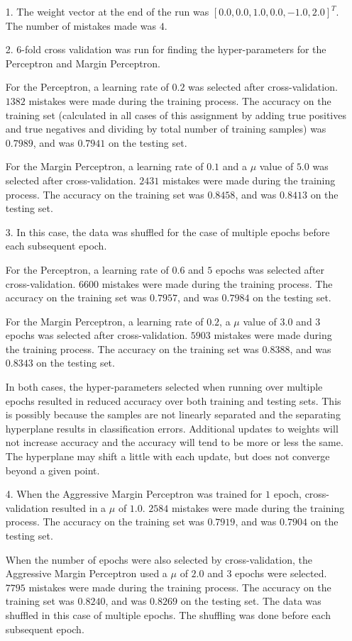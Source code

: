 \begin{enumerate}
\item[1.] The weight vector at the end of the run was $\left [0.0, 0.0, 1.0, 0.0, -1.0, 2.0 \right ] ^ T$. The number of mistakes made was $4$.
  
\item[2.] 6-fold cross validation was run for finding the hyper-parameters for the Perceptron and Margin Perceptron. 

For the Perceptron, a learning rate of $0.2$ was selected after cross-validation. $1382$ mistakes were made during the training process. The accuracy on the training set (calculated in all cases of this assignment by adding true positives and true negatives and dividing by total number of training samples) was $0.7989$, and was $0.7941$ on the testing set.

For the Margin Perceptron, a learning rate of $0.1$ and a $\mu$ value of $5.0$ was selected after cross-validation. $2431$ mistakes were made during the training process. The accuracy on the training set was $0.8458$, and was $0.8413$ on the testing set.

\item[3.] In this case, the data was shuffled for the case of multiple epochs before each subsequent epoch.

For the Perceptron, a learning rate of $0.6$ and $5$ epochs was selected after cross-validation. $6600$ mistakes were made during the training process. The accuracy on the training set was $0.7957$, and was $0.7984$ on the testing set.

For the Margin Perceptron, a learning rate of $0.2$, a $\mu$ value of $3.0$ and $3$ epochs was selected after cross-validation. $5903$ mistakes were made during the training process. The accuracy on the training set was $0.8388$, and was $0.8343$ on the testing set.

In both cases, the hyper-parameters selected when running over multiple epochs resulted in reduced accuracy over both training and testing sets. This is possibly because the samples are not linearly separated and the separating hyperplane results in classification errors. Additional updates to weights will not increase accuracy and the accuracy will tend to be more or less the same. The hyperplane may shift a little with each update, but does not converge beyond a given point.

\item[4.] When the Aggressive Margin Perceptron was trained for $1$ epoch, cross-validation resulted in a $\mu$ of $1.0$. $2584$ mistakes were made during the training process. The accuracy on the training set was $0.7919$, and was $0.7904$ on the testing set.

When the number of epochs were also selected by cross-validation, the Aggressive Margin Perceptron used a $\mu$ of $2.0$ and $3$ epochs were selected. $7795$ mistakes were made during the training process. The accuracy on the training set was $0.8240$, and was $0.8269$ on the testing set. The data was shuffled in this case of multiple epochs. The shuffling was done before each subsequent epoch.


\end{enumerate}


